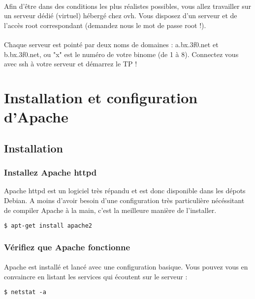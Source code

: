 \documentclass[12pt,a4paper]{article}
\begin{document}
\paragraph{}
Afin d'être dans des conditions les plus réalistes possibles, vous allez travailler sur un serveur dédié (virtuel) hébergé chez ovh. Vous disposez d'un serveur et de l'accès root correspondant (demandez nous le mot de passe root !).

\paragraph{}
Chaque serveur est pointé par deux noms de domaines : a.bx.3f0.net et b.bx.3f0.net, ou "x" est le numéro de votre binome (de 1 à 8). Connectez vous avec ssh à votre serveur et démarrez le TP !

\section{Installation et configuration d'Apache}
\subsection{Installation}

\subsubsection{Installez Apache httpd}
Apache httpd est un logiciel très répandu et est donc disponible dans les dépots Debian. A moins d'avoir besoin d'une configuration très particulière nécéssitant de compiler Apache à la main, c'est la meilleure manière de l'installer.

\begin{lstlisting}
$ apt-get install apache2
\end{lstlisting}

\subsubsection{Vérifiez que Apache fonctionne}
\paragraph{}
Apache est installé et lancé avec une configuration basique. Vous pouvez vous en convaincre en listant les services qui écoutent sur le serveur : 

\begin{lstlisting}
$ netstat -a
\end{lstlisting}
\end{document}
